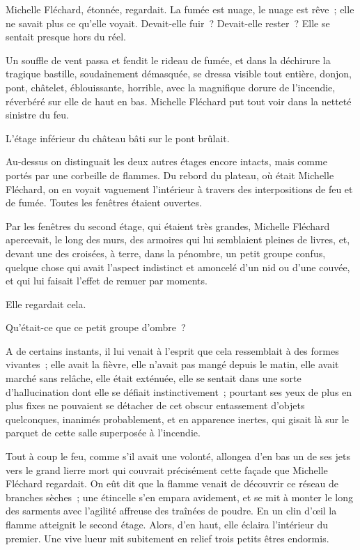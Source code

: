 \documentclass[french,twoside]{book} %
\begin{document}
Michelle Fléchard, étonnée, regardait. La fumée est nuage, le nuage est rêve ; elle ne savait plus ce qu’elle voyait. Devait-elle fuir ? Devait-elle rester ? Elle se sentait presque hors du réel.\par
Un souffle de vent passa et fendit le rideau de fumée, et dans la déchirure la tragique bastille, soudainement démasquée, se dressa visible tout entière, donjon, pont, châtelet, éblouissante, horrible, avec la magnifique dorure de l’incendie, réverbéré sur elle de haut en bas. Michelle Fléchard put tout voir dans la netteté sinistre du feu.\par
 L’étage inférieur du château bâti sur le pont brûlait.\par
Au-dessus on distinguait les deux autres étages encore intacts, mais comme portés par une corbeille de flammes. Du rebord du plateau, où était Michelle Fléchard, on en voyait vaguement l’intérieur à travers des interpositions de feu et de fumée. Toutes les fenêtres étaient ouvertes.\par
Par les fenêtres du second étage, qui étaient très grandes, Michelle Fléchard apercevait, le long des murs, des armoires qui lui semblaient pleines de livres, et, devant une des croisées, à terre, dans la pénombre, un petit groupe confus, quelque chose qui avait l’aspect indistinct et amoncelé d’un nid ou d’une couvée, et qui lui faisait l’effet de remuer par moments.\par
Elle regardait cela.\par
Qu’était-ce que ce petit groupe d’ombre ?\par
A de certains instants, il lui venait à l’esprit que cela ressemblait à des formes vivantes ; elle avait la fièvre, elle n’avait pas mangé depuis le matin, elle avait marché sans relâche, elle était exténuée, elle se sentait dans une sorte d’hallucination dont elle se défiait instinctivement ; pourtant ses yeux de plus en plus fixes ne pouvaient se détacher de cet obscur entassement d’objets quelconques, inanimés probablement, et en apparence inertes, qui gisait là sur le parquet de cette salle superposée à l’incendie.\par
Tout à coup le feu, comme s’il avait une volonté, allongea d’en bas un de ses jets vers le grand lierre mort qui couvrait précisément cette façade que Michelle Fléchard regardait. On eût dit que la flamme  venait de découvrir ce réseau de branches sèches ; une étincelle s’en empara avidement, et se mit à monter le long des sarments avec l’agilité affreuse des traînées de poudre. En un clin d’œil la flamme atteignit le second étage. Alors, d’en haut, elle éclaira l’intérieur du premier. Une vive lueur mit subitement en relief trois petits êtres endormis.\par
\end{document}
